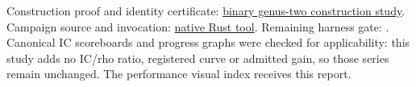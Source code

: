 \documentclass[10pt]{article}
\begin{document}
Construction proof and identity certificate:
\href{https://github.com/aburan28/crypto/tree/d38a85f7e1ac02358223b58d71633f71f2efa7fa/research/binary_genus2_cover_20261014}{binary genus-two construction study}.
Campaign source and invocation:
\href{https://github.com/aburan28/crypto/tree/dbd33f00da0a0ac35f285603ec168ad9d91a1d79/tools/binary-genus2-cover}{native Rust tool}.
Remaining harness gate: .
Canonical IC scoreboards and progress graphs were checked for applicability:
this study adds no IC/rho ratio, registered curve or admitted gain, so those
series remain unchanged. The performance visual index receives this report.
\end{document}
